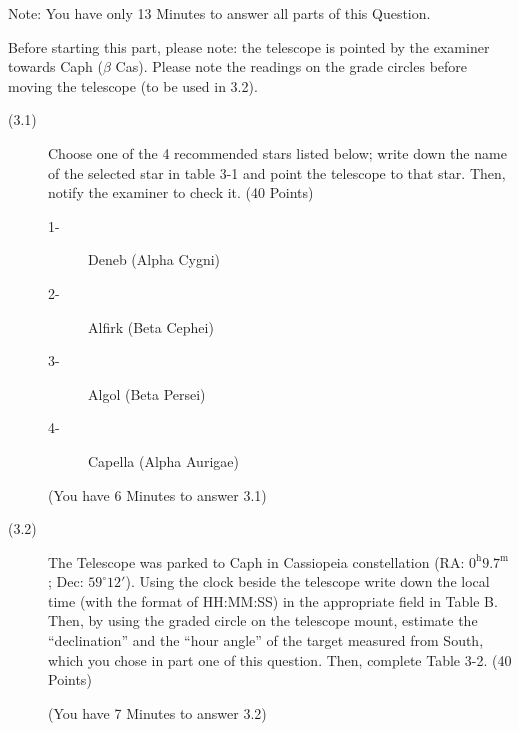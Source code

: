 Note: You have only 13 Minutes to answer all parts of this Question.

Before starting this part, please note: the telescope is pointed by the
examiner towards Caph ($\beta$ Cas). Please note the readings on the grade
circles before moving the telescope (to be used in 3.2).

\begin{description}
\item[(3.1)] Choose one of the 4 recommended stars listed below; write down
  the name of the selected star in table 3-1 and point the telescope to that
  star. Then, notify the examiner to check it. \hfill(40 Points)
  \begin{description}
  \item[1-] Deneb (Alpha Cygni)
  \item[2-] Alfirk (Beta Cephei)
  \item[3-] Algol (Beta Persei)
  \item[4-] Capella (Alpha Aurigae)
  \end{description}
  (You have 6 Minutes to answer 3.1)
\item[(3.2)] The Telescope was parked to Caph in Cassiopeia constellation
  (RA: $0^{\mathrm{h}}9.7^{\mathrm{m}}$; Dec: $59^\circ 12'$). Using the
  clock beside the telescope write down the local time (with the format of
  HH:MM:SS) in the appropriate field in Table B. Then, by using the graded
  circle on the telescope mount, estimate the ``declination'' and the ``hour
  angle'' of the target measured from South, which you chose in part one of
  this question. Then, complete Table 3-2. \hfill(40 Points)

  (You have 7 Minutes to answer 3.2)
\end{description}
